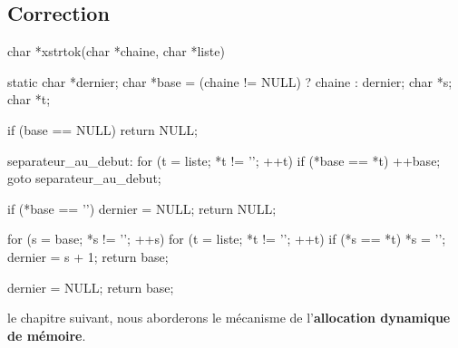 \subsection{Correction}
\label{correction-17}

\begin{C}
char *xstrtok(char *chaine, char *liste)
{
    static char *dernier;
    char *base = (chaine != NULL) ? chaine : dernier;
    char *s;
    char *t;

    if (base == NULL)
        return NULL;

separateur_au_debut:
    for (t = liste; *t != '\0'; ++t)
        if (*base == *t)
        {
            ++base;
            goto separateur_au_debut;
        }

    if (*base == '\0')
    {
        dernier = NULL;
        return NULL;
    }

    for (s = base; *s != '\0'; ++s)
        for (t = liste; *t != '\0'; ++t)
            if (*s == *t)
            {
                *s = '\0';
                dernier = s + 1;
                return base;
            }

    dernier = NULL;
    return base;
}
\end{C}

\hrulefill

le chapitre suivant, nous aborderons le mécanisme de
l'\textbf{allocation dynamique de mémoire}.